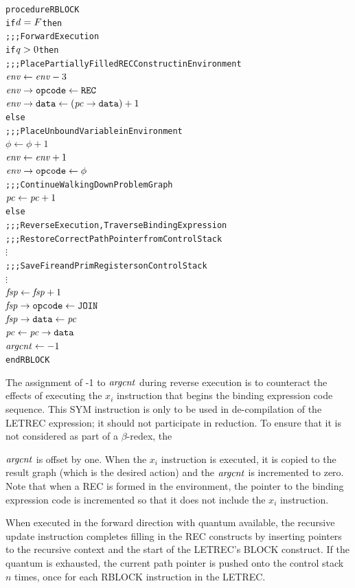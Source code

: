 \par\smallskip\noindent\begin{minipage}{\linewidth}
\begin{alltt}
procedure RBLOCK
  if \(\rt{d} = F\) then
    \textrm{;;; Forward Execution}
    if \(\rt{q} > 0\) then
      \textrm{;;; Place Partially Filled REC Construct in Environment}
      \(\rt{env} \leftarrow \rt{env}-3\)
      \(\rtfield{env}{opcode} \leftarrow \mathtt{REC}\)
      \(\rtfield{env}{data} \leftarrow (\rtfield{pc}{data})+1\)
    else
      \textrm{;;; Place Unbound Variable in Environment}
      \(\phi \leftarrow \phi+1\)
      \(\rt{env} \leftarrow \rt{env}+1\)
      \(\rtfield{env}{opcode} \leftarrow \phi\)
    \textrm{;;; Continue Walking Down Problem Graph}
    \(\rt{pc} \leftarrow \rt{pc}+1\)
  else
    \textrm{;;; Reverse Execution, Traverse Binding Expression}
    \textrm{;;; Restore Correct Path Pointer from Control Stack}
    \(\vdots\)
    \textrm{;;; Save Fire and Prim Registers on Control Stack}
    \(\vdots\)
    \(\rt{fsp} \leftarrow \rt{fsp}+1\)
    \(\rtfield{fsp}{opcode} \leftarrow \mathtt{JOIN}\)
    \(\rtfield{fsp}{data} \leftarrow \rt{pc}\)
    \(\rt{pc} \leftarrow \rtfield{pc}{data}\)
    \(\rt{argcnt} \leftarrow -1\)
end RBLOCK
\end{alltt}
\end{minipage}\par\smallskip


The assignment of -1 to \(\mathit{argcnt}\) during reverse execution is to counteract the effects
of executing the \(x_i\)\THOR{)} instruction that begins the binding expression
code sequence. This SYM instruction is only to be used in de-compilation of the LETREC
expression; it should not participate in reduction. To ensure that it is not considered as
part of a \(\beta\)-redex, the


\(\mathit{argcnt}\) is offset by one. When the \(x_i\)\THOR{)} instruction is executed, it
is copied to the result graph (which is the desired action) and the \(\mathit{argcnt}\) is
incremented to zero. Note that when a REC is formed in the environment, the pointer to the
binding expression code is incremented so that it does not include the \(x_i\)\THOR{)}
instruction.

When executed in the forward direction with quantum available, the recursive update
instruction completes filling in the REC constructs by inserting pointers to the recursive
context and the start of the LETREC's BLOCK construct. If the quantum is exhausted, the
current path pointer is pushed onto the control stack \(n\) times, once for each RBLOCK
instruction in the LETREC.

